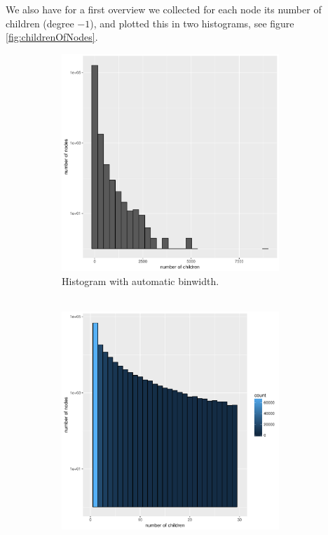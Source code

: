     We also have for a first overview we collected for each node its number of children (degree $-1$), 
      and plotted this in two histograms, see figure \ref{fig:childrenOfNodes}. \\
    \begin{figure}
      \centering
      \begin{subfigure}[b]{0.59\textwidth}
        \includegraphics[width=0.9\textwidth]{Figures/multifurc.pdf}
        \caption{Histogram with automatic binwidth. \\ ~}
      \end{subfigure}
      \begin{subfigure}[b]{0.4\textwidth}
        \includegraphics[trim = 0mm 0mm 30mm 0mm, clip, width=0.9\textwidth]{Figures/multifurc_small.pdf}

\end{subfigure}
\end{figure}
